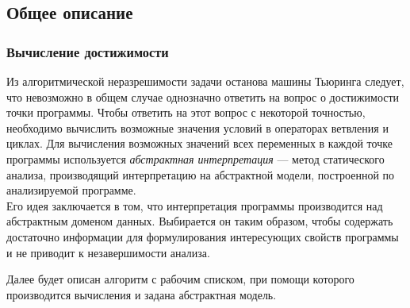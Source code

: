 \subsection{Общее описание}%
\label{sec:howto}
\subsubsection{Вычисление достижимости}%
\label{sec:reachability}
Из алгоритмической неразрешимости задачи
останова машины Тьюринга следует, что невозможно в общем случае
однозначно ответить на вопрос о достижимости точки программы. 
Чтобы ответить на этот вопрос с некоторой точностью, необходимо
вычислить возможные значения условий в операторах ветвления и циклах.
Для вычисления возможных значений всех переменных в каждой точке
программы используется \emph{абстрактная интерпретация} --- метод 
статического анализа, производящий интерпретацию на абстрактной модели,
построенной по анализируемой программе\cite{Nielson1999}.\\
Его идея заключается в том, что интерпретация программы производится
над абстрактным доменом данных. Выбирается он таким образом, чтобы
содержать достаточно информации для формулирования интересующих
свойств программы и не приводит к незавершимости анализа.

Далее будет описан алгоритм с рабочим списком, при помощи которого
производится вычисления и задана абстрактная модель.
